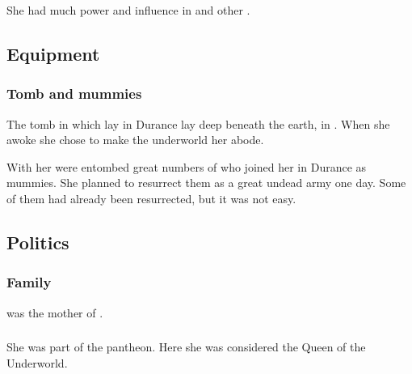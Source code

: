 She had much power and influence in  and other . 









\subsection{Equipment}





\subsubsection{Tomb and mummies}
The tomb in which \Thessulax lay in Durance lay deep beneath the earth, in \KaiLeng. 
When she awoke she chose to make the underworld her abode. 

With her were entombed great numbers of \ophidians who joined her in Durance as mummies. 
She planned to resurrect them as a great undead army one day. 
Some of them had already been resurrected, but it was not easy. 









\subsection{Politics}





\subsubsection{Family}
\Thessulax was the mother of . 





\subsubsection{\Taortha}
She was part of the \taortha pantheon.
Here she was considered the Queen of the Underworld. 
















